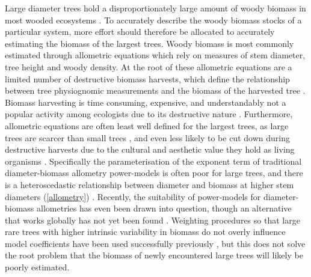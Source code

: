 \begin{refsection}
Large diameter trees hold a disproportionately large amount of woody biomass in most wooded ecosystems \citep{Bastin2015, Lutz2018}. To accurately describe the woody biomass stocks of a particular system, more effort should therefore be allocated to accurately estimating the biomass of the largest trees. Woody biomass is most commonly estimated through allometric equations which rely on measures of stem diameter, tree height and woody density. At the root of these allometric equations are a limited number of destructive biomass harvests, which define the relationship between tree physiognomic measurements and the biomass of the harvested tree \citep{Chave2005}. Biomass harvesting is time consuming, expensive, and understandably not a popular activity among ecologists due to its destructive nature \citep{Roxburgh2015}. Furthermore, allometric equations are often least well defined for the largest trees, as large trees are scarcer than small trees \citep{Lutz2018, Lindenmayer2012}, and even less likely to be cut down during destructive harvests due to the cultural and aesthetic value they hold as living organisms \citep{Blicharska2014}. Specifically the parameterisation of the exponent term of traditional diameter-biomass allometry power-models is often poor for large trees, and there is a heteroscedastic relationship between diameter and biomass at higher stem diameters (\autoref{allometry}) \citep{Chave2004, Chave2014}. Recently, the suitability of power-models for diameter-biomass allometries has even been drawn into question, though an alternative that works globally has not yet been found \citep{Picard2015}. Weighting procedures so that large rare trees with higher intrinsic variability in biomass do not overly influence model coefficients have been used successfully previously \citep{Chave2014, McNicol2015}, but this does not solve the root problem that the biomass of newly encountered large trees will likely be poorly estimated. 


\end{refsection}
